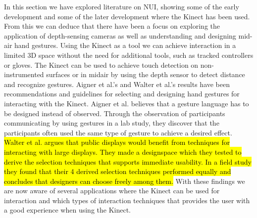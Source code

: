 In this section we have explored literature on NUI, showing some of the early development and some of the later development where the Kinect has been used. From this we can deduce that there have been a focus on exploring the application of depth-sensing cameras as well as understanding and designing mid-air hand gestures.
Using the Kinect as a tool we can achieve interaction in a limited 3D space without the need for additional tools, such as tracked controllers or gloves. The Kinect can be used to achieve touch detection on non-instrumented surfaces or in midair by using the depth sensor to detect distance and recognize gestures.  Aigner et al.'s and Walter et al.'s results have been recommendations and guidelines for selecting and designing hand gestures for interacting with the Kinect. Aigner  et al. believes that a gesture language has to be designed instead of observed. Through the observation of participants communicating by using gestures in a lab study, they discover that the participants often used the same type of gesture to achieve a desired effect.
\hl{Walter et al. argues that public displays would benefit from techniques for interacting with large displays. They made a designspace which they tested to derive the selection techniques that supports immediate usability. In a field study they found that their 4 derived selection techniques performed equally and concludes that designers can choose freely among them.}
With these findings we are now aware of several applications where the Kinect can be used for interaction and which types of interaction techniques that provides the user with a good experience when using the Kinect.